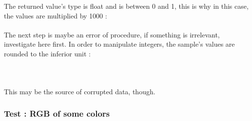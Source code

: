 \documentclass[a4paper, 12pt]{article}
\begin{document}
The returned value's type is float and is between 0 and 1, this is why in this case, the values are multiplied by 1000 :
\\ \\
The next step is maybe an error of procedure, if something is irrelevant, investigate here first. In order to manipulate integers, the sample's values are rounded to the inferior unit :
\\ \\
\\ \\
This may be the source of corrupted data, though.

\subsubsection{Test : RGB of some colors}
\end{document}

